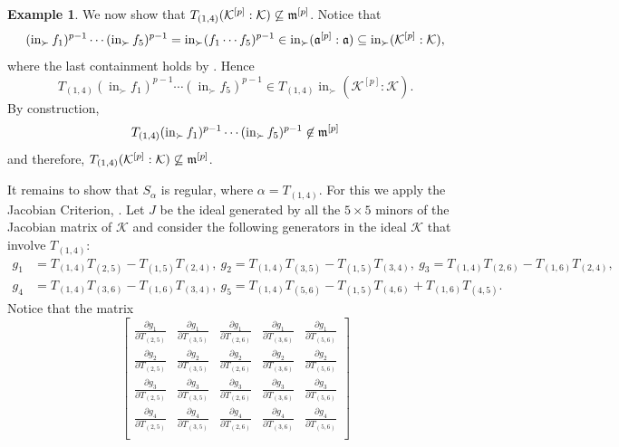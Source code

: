 \documentclass[11pt,a4paper,reqno,dvipsnames]{amsart}
\theoremstyle{plain}
\theoremstyle{definition}
\newtheorem{Assumptions and Discussion}[Theorem]{Assumptions and Discussion}
\newtheorem{Example}[Theorem]{Example}
\theoremstyle{remark}
\def\ini{\operatorname{in}}
\newcommand\calK{\mathcal{K}}
\begin{document}
\begin{Example}
We now show that  $T_{(1,4)} (\calK^{[p]}:\calK) \not \subseteq \frak{m}^{[p]} $. Notice that 
$$(\ini_{\succ}f_1)^{p-1} \cdots (\ini_{\succ}f_5)^{p-1}=\ini_{\succ}(f_1 \cdots f_5)^{p-1}\in \ini_{\succ}(\frak{a}^{[p]}:\frak{a}) \subseteq \ini_{\succ}(\calK^{[p]}:\calK),$$
where the last containment holds by \cite[Corollary 3.3]{PT}. Hence $$T_{(1,4)}(\ini_{\succ}f_1)^{p-1} \cdots (\ini_{\succ}f_5)^{p-1}\in T_{(1,4)}\ini_{\succ}(\calK^{[p]}:\calK).$$
By construction,  
$$T_{(1,4)}(\ini_{\succ}f_1)^{p-1} \cdots (\ini_{\succ}f_5)^{p-1} \not \in \frak{m}^{[p]}$$  and therefore, $T_{(1,4)}(\calK^{[p]}: \calK) \not \subseteq \frak{m}^{[p]}$.

It remains to show that $S_{\alpha}$ is regular, where $\alpha=T_{(1,4)}$. 
For this we apply the Jacobian Criterion, \cite[Corollary 16.20]{EiComm}. Let $J$ be the ideal generated by all the $5\times 5$ minors of the Jacobian matrix of $\calK$ and consider the following generators in the ideal $\calK$ that involve $T_{(1,4)}$:
\begin{align*}
    g_1&=T_{(1,4)}T_{(2,5)}-T_{(1,5)}T_{(2,4)}, \
    g_2=T_{(1,4)}T_{(3,5)}-T_{(1,5)}T_{(3,4)}, \ g_3=T_{(1,4)}T_{(2,6)}-T_{(1,6)}T_{(2,4)},\\ 
    g_4&=T_{(1,4)}T_{(3,6)}-T_{(1,6)}T_{(3,4)},\ g_5=T_{(1,4)}T_{(5,6)}-T_{(1,5)}T_{(4,6)}+T_{(1,6)}T_{(4,5)} .
\end{align*}
Notice that the matrix 
$${\begin{bmatrix}
    \frac{\partial g_1}{\partial T_{(2,5)}} &     \frac{\partial g_1}{\partial T_{(3,5)}}  &   \frac{\partial g_1}{\partial T_{(2,6)}}     &    \frac{\partial g_1}{\partial T_{(3,6)}}    &    \frac{\partial g_1}{\partial T_{(5,6)}}    \\
    \frac{\partial g_2}{\partial T_{(2,5)}}       & \frac{\partial g_2}{\partial T_{(3,5)}} &   \frac{\partial g_2}{\partial T_{(2,6)}}    &    \frac{\partial g_2}{\partial T_{(3,6)}}    &    \frac{\partial g_2}{\partial T_{(5,6)}}   \\
    \frac{\partial g_3}{\partial T_{(2,5)}}        & \frac{\partial g_3}{\partial T_{(3,5)}}       & \frac{\partial g_3}{\partial T_{(2,6)}} &    \frac{\partial g_3}{\partial T_{(3,6)}}   &   \frac{\partial g_3}{\partial T_{(5,6)}}     \\
    \frac{\partial g_4}{\partial T_{(2,5)}}        & \frac{\partial g_4}{\partial T_{(3,5)}}        & \frac{\partial g_4}{\partial T_{(2,6)}}         & \frac{\partial g_4}{\partial T_{(3,6)}} &   \frac{\partial g_4}{\partial T_{(5,6)}}     \\

\end{bmatrix}}$$
\end{Example}
\end{document}
